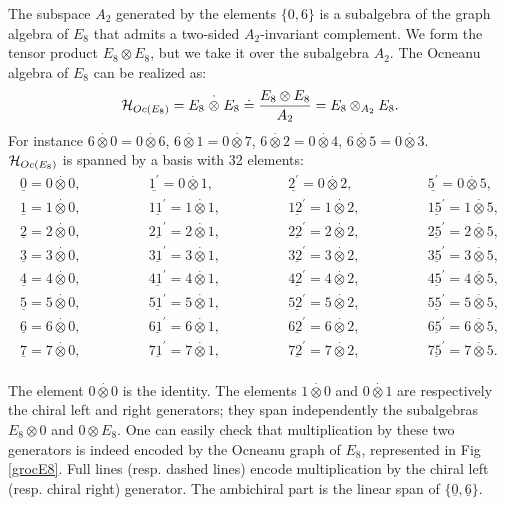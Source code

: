 \documentclass[a4paper,11pt]{article}
\def \otimesdot {\stackrel{\cdot}{\otimes}}
\newcommand{\ud}[1]{\underline{#1}}
\begin{document}
The subspace $A_2$ generated by the elements $\{ 0, 6 \}$ is a
subalgebra of the graph algebra of $E_8$ that admits a two-sided
$A_2$-invariant complement.
We form the tensor product $E_8 \otimes E_8$, but we take it over
the subalgebra $A_2$. The Ocneanu algebra of $E_8$ can be realized as:
$$
{\cal H}_{Oc(E_8)} = E_8 \otimesdot E_8 \doteq
\frac{E_8 \otimes E_8}{A_2} = E_8 \otimes_{A_2} E_8.
$$
For instance $6 \otimesdot 0 = 0 \otimesdot 6$, $6 \otimesdot 1 = 0 \otimesdot
7$, $6 \otimesdot 2 = 0 \otimesdot 4$, $6 \otimesdot 5 = 0 \otimesdot
3$.\\
${\cal H}_{Oc(E_8)}$ is spanned by a basis with 32 elements:
$$
\begin{array}{cccc}
\ud0 =0 \otimesdot 0, & \qquad\qquad \ud{1^{'}}  =0 \otimesdot 1, &
\qquad\qquad \ud{2^{'}}  =0 \otimesdot 2, & \qquad\qquad \ud{5^{'}} =0
\otimesdot 5,\\
\ud1 =1 \otimesdot 0, & \qquad\qquad \ud{11^{'}} =1 \otimesdot 1, &
\qquad\qquad \ud{12^{'}} =1 \otimesdot 2, & \qquad\qquad \ud{15^{'}}=1
\otimesdot 5,\\
\ud2 =2 \otimesdot 0, & \qquad\qquad \ud{21^{'}} =2 \otimesdot 1, &
\qquad\qquad \ud{22^{'}} =2 \otimesdot 2, & \qquad\qquad \ud{25^{'}}=2
\otimesdot 5,\\
\ud3 =3 \otimesdot 0, & \qquad\qquad \ud{31^{'}} =3 \otimesdot 1, &
\qquad\qquad \ud{32^{'}} =3 \otimesdot 2, & \qquad\qquad \ud{35^{'}}=3
\otimesdot 5,\\
\ud4 =4 \otimesdot 0, & \qquad\qquad \ud{41^{'}} =4 \otimesdot 1, &
\qquad\qquad \ud{42^{'}} =4 \otimesdot 2, & \qquad\qquad \ud{45^{'}}=4
\otimesdot 5,\\
\ud5 =5 \otimesdot 0, & \qquad\qquad \ud{51^{'}} =5 \otimesdot 1, &
\qquad\qquad \ud{52^{'}} =5 \otimesdot 2, & \qquad\qquad \ud{55^{'}}=5
\otimesdot 5,\\
\ud6 =6 \otimesdot 0, & \qquad\qquad \ud{61^{'}} =6 \otimesdot 1, &
\qquad\qquad \ud{62^{'}} =6 \otimesdot 2, & \qquad\qquad \ud{65^{'}}=6
\otimesdot 5,\\
\ud7 =7 \otimesdot 0, & \qquad\qquad \ud{71^{'}} =7 \otimesdot 1, &
\qquad\qquad \ud{72^{'}} =7 \otimesdot 2, & \qquad\qquad \ud{75^{'}}=7
\otimesdot 5.\\
\end{array}
$$

The element $ 0 \otimesdot 0$ is the identity. The elements $1 \otimesdot
0$ and $0 \otimesdot 1$ are respectively the chiral left and right
generators; they span independently the subalgebras $E_{8}\otimes 0$
and $0 \otimes E_{8}$.
One can easily check that
multiplication by these two generators is indeed encoded by the Ocneanu
graph of $E_8$, represented in Fig \ref{grocE8}. Full lines (resp.
dashed lines) encode multiplication by the chiral left (resp. chiral right)
generator.
The  ambichiral part is the linear span of $\{\ud0, \ud6 \}$.
\end{document}
